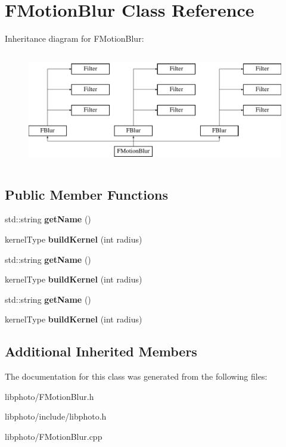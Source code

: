 \hypertarget{classFMotionBlur}{\section{F\-Motion\-Blur Class Reference}
\label{classFMotionBlur}
}
Inheritance diagram for F\-Motion\-Blur\-:\begin{figure}[H]
\begin{center}
\leavevmode
\includegraphics[height=5.000000cm]{classFMotionBlur}
\end{center}
\end{figure}
\subsection*{Public Member Functions}
\begin{DoxyCompactItemize}
\item 
\hypertarget{classFMotionBlur_aeb40f52478dcf27d5fa8fec4aa473975}{std\-::string {\bfseries get\-Name} ()}\label{classFMotionBlur_aeb40f52478dcf27d5fa8fec4aa473975}

\item 
\hypertarget{classFMotionBlur_a105abc618c4fe5ddd890ad2ff1836979}{kernel\-Type {\bfseries build\-Kernel} (int radius)}\label{classFMotionBlur_a105abc618c4fe5ddd890ad2ff1836979}

\item 
\hypertarget{classFMotionBlur_aeb40f52478dcf27d5fa8fec4aa473975}{std\-::string {\bfseries get\-Name} ()}\label{classFMotionBlur_aeb40f52478dcf27d5fa8fec4aa473975}

\item 
\hypertarget{classFMotionBlur_a105abc618c4fe5ddd890ad2ff1836979}{kernel\-Type {\bfseries build\-Kernel} (int radius)}\label{classFMotionBlur_a105abc618c4fe5ddd890ad2ff1836979}

\item 
\hypertarget{classFMotionBlur_aeb40f52478dcf27d5fa8fec4aa473975}{std\-::string {\bfseries get\-Name} ()}\label{classFMotionBlur_aeb40f52478dcf27d5fa8fec4aa473975}

\item 
\hypertarget{classFMotionBlur_a105abc618c4fe5ddd890ad2ff1836979}{kernel\-Type {\bfseries build\-Kernel} (int radius)}\label{classFMotionBlur_a105abc618c4fe5ddd890ad2ff1836979}

\end{DoxyCompactItemize}
\subsection*{Additional Inherited Members}


The documentation for this class was generated from the following files\-:\begin{DoxyCompactItemize}
\item 
libphoto/F\-Motion\-Blur.\-h\item 
libphoto/include/libphoto.\-h\item 
libphoto/F\-Motion\-Blur.\-cpp\end{DoxyCompactItemize}
